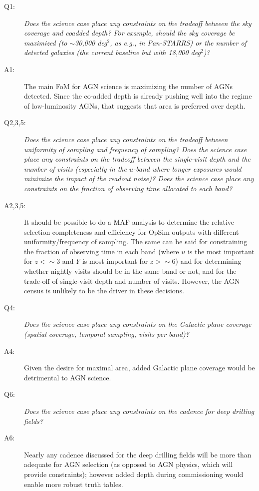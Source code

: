 \begin{description}

\item[Q1:] {\it Does the science case place any constraints on the
tradeoff between the sky coverage and coadded depth? For example, should
the sky coverage be maximized (to $\sim$30,000 deg$^2$, as e.g., in
Pan-STARRS) or the number of detected galaxies (the current baseline but
with 18,000 deg$^2$)?}

\item[A1:] The main FoM for AGN science is maximizing the number of AGNs
detected.  Since the co-added depth is already pushing well into the
regime of low-luminosity AGNs, that suggests that area is preferred over
depth.

\item[Q2,3,5:] {\it Does the science case place any constraints on the
tradeoff between uniformity of sampling and frequency of  sampling? Does
the science case place any constraints on the tradeoff between the
single-visit depth and the number of visits (especially in the $u$-band
where longer exposures would minimize the impact of the readout noise)?
Does the science case place any constraints on the fraction of observing
time allocated to each band?}

\item[A2,3,5:] It should be possible to do a MAF analysis to determine
the relative selection completeness and efficiency for OpSim outputs
with different uniformity/frequency of sampling. The same can be said
for constraining the fraction of observing time in each band (where $u$
is the most important for $z<\sim3$ and $Y$ is most important for $z>\sim6$)
and for determining whether nightly
visits should be in the same band or not, and for the trade-off of
single-visit depth and number of visits. However, the AGN census is
unlikely to be the driver in these decisions.

\item[Q4:] {\it Does the science case place any constraints on the
Galactic plane coverage (spatial coverage, temporal sampling, visits per
band)?}

\item[A4:] Given the desire for maximal area, added Galactic plane
coverage would be detrimental to AGN science.

\item[Q6:] {\it Does the science case place any constraints on the
cadence for deep drilling fields?}

\item[A6:] Nearly any cadence discussed for the deep drilling fields
will be more than adequate for AGN selection (as opposed to AGN
physics, which will provide constraints); however added depth during
commissioning would enable more robust truth tables.


\end{description}
